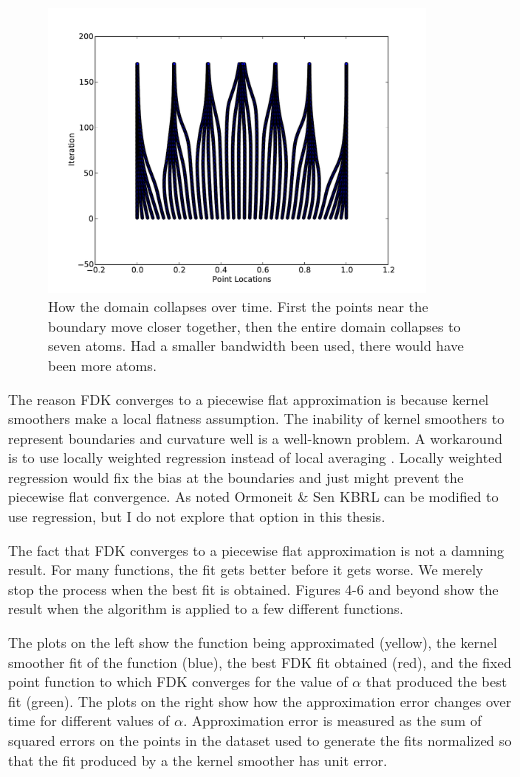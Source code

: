 \begin{figure}[!!!ht]
  \centering
    \includegraphics[width=100mm]{figs/linecon.pdf}
  \caption[FIIRA convergence]{How the domain collapses over time.
   First the points near the boundary move closer together,
   then the entire domain collapses to seven atoms.
   Had a smaller bandwidth been used, there would have been more atoms.}
  \label{fig:linecon}
\end{figure}

The reason FDK converges to a piecewise flat approximation is because
kernel smoothers make a local flatness assumption.
The inability of kernel smoothers to represent boundaries and curvature
well is a well-known problem.
A workaround is to use locally weighted regression instead of local
averaging \cite{kercar}.
Locally weighted regression would fix the bias at the boundaries and
just might prevent the piecewise flat convergence.
As noted Ormoneit \& Sen \cite{kbrl} KBRL can be modified to use regression,
but I do not explore that option in this thesis.

The fact that FDK converges to a piecewise flat approximation is not a
damning result.
For many functions, the fit gets better before it gets worse.
We merely stop the process when the best fit is obtained.
Figures 4-6 and beyond show the result when the algorithm is applied to 
a few different functions.

The plots on the left show the function being approximated (yellow), the kernel
smoother fit of the function (blue), the best FDK fit obtained (red), and the fixed
point function to which FDK converges for the value of $\alpha$
that produced the best fit (green).
The plots on the right show how the approximation error changes over
time for different values of $\alpha$.
Approximation error is measured as the sum of squared errors on the points
in the dataset used to generate the fits normalized so that the fit produced
by a the kernel smoother has unit error.

